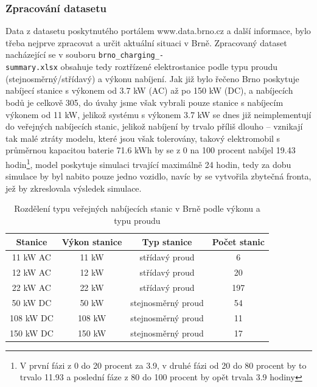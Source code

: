\documentclass[a4paper,11pt]{article}
\begin{document}
\subsubsection{Zpracování datasetu}
\label{dataset-processing}
Data z datasetu poskytnutého portálem www.data.brno.cz \cite{data_brno} a další informace, bylo třeba nejprve zpracovat a určit 
aktuální situaci v Brně. Zpracovaný dataset nacházející se v souboru \texttt{\mbox{brno\_charging\_}-\\summary.xlsx}
obsahuje tedy roztřízené elektrostanice podle typu proudu (stejnosměrný/střídavý) a výkonu nabíjení. Jak již bylo
řečeno Brno poskytuje nabíjecí stanice s výkonem od 3.7 kW (AC) až po 150 kW (DC), a nabíjecích bodů je celkově 305,
do úvahy jsme však vybrali pouze stanice s nabíjecím výkonem od 11 kW, jelikož systému s výkonem 3.7 kW se dnes již 
neimplementují do veřejných nabíjecích stanic, jelikož nabíjení by trvalo příliš dlouho -- vznikají tak malé ztráty
modelu, které jsou však tolerovány, takový elektromobil s průměrnou kapacitou baterie 71.6 kWh by se z 0 na 100 procent 
nabíjel 19.43 hodin\footnote{V první fázi z 0 do 20 procent za 3.9, v druhé fázi od 20 do 80 procent by to trvalo 11.93 a poslední 
fáze z 80 do 100 procent by opět trvala 3.9 hodiny}, model poskytuje simulaci trvající maximálně 24 hodin, tedy za dobu simulace by 
byl nabito pouze jedno vozidlo, navíc by se vytvořila zbytečná fronta, jež by zkreslovala výsledek simulace.

\begin{table}[h!]
    \centering
    \vspace{0.5cm} %
    \begin{tabular}{|c|c|c|c|}
        \hline
        \textbf{Stanice} & \textbf{Výkon stanice} & \textbf{Typ stanice} & \textbf{Počet stanic}\\
        \hline
        11 kW  AC &  11 kW   & střídavý proud       & 6   \\
        \hline
        12 kW  AC &  12 kW   & střídavý proud       & 20  \\
        \hline
        22 kW  AC &  22 kW   & střídavý proud       & 197 \\
        \hline
        50 kW  DC &  50 kW   & stejnosměrný proud   & 54  \\
        \hline
        108 kW DC &  108 kW  & stejnosměrný proud   & 11  \\
        \hline
        150 kW DC &  150 kW  & stejnosměrný proud   & 17  \\
        \hline
    \end{tabular}
    \caption{Rozdělení typu veřejných nabíjecích stanic v Brně podle výkonu a typu proudu}
    \label{table:charging-stations-distribution}
    \vspace{0.5cm} %
\end{table}
\end{document}
